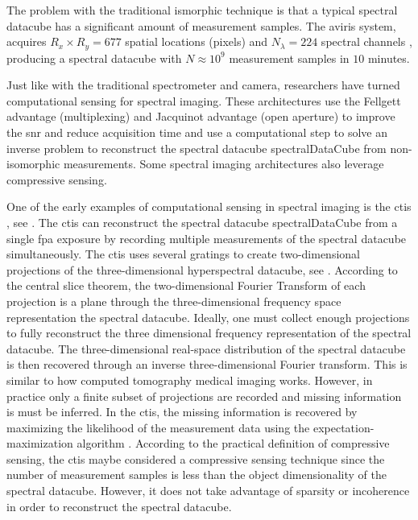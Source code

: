 The problem with the traditional ismorphic technique is that a typical spectral datacube has a significant amount of measurement samples. The \acrfull{aviris} system, acquires $R_x \times R_y = 677$ spatial locations (pixels) and $N_{\lambda} = 224$ spectral channels \cite{green1998imaging}, producing a spectral datacube with $N \approx 10^9$ measurement samples in $10$ minutes. 

Just like with the traditional spectrometer and camera, researchers have turned \gls{computational sensing} for spectral imaging. These architectures use the \gls{Fellgett advantage} (multiplexing) and \gls{Jacquinot advantage} (open aperture) to improve the \acrfull{snr} and reduce acquisition time and use a computational step to solve an inverse problem to reconstruct the spectral datacube \gls{spectralDataCube} from non-isomorphic measurements. Some spectral imaging architectures also leverage \gls{compressive sensing}. 

One of the early examples of computational sensing in spectral imaging is the \gls{ctis} \cite{descour1995computed}, see . The \gls{ctis} can reconstruct the spectral datacube \gls{spectralDataCube} from a single \gls{fpa} exposure by recording multiple measurements of the spectral datacube simultaneously. The \gls{ctis} uses several gratings to create two-dimensional projections of the three-dimensional hyperspectral datacube, see . According to the central slice theorem, the two-dimensional Fourier Transform of each projection is a plane through the three-dimensional frequency space representation the spectral datacube. Ideally, one must collect enough projections to fully reconstruct the three dimensional frequency representation of the spectral datacube. The three-dimensional real-space distribution of the spectral datacube is then recovered through an inverse three-dimensional Fourier transform. This is similar to how computed tomography medical imaging works. However, in practice only a finite subset of projections are recorded and missing information is must be inferred. In the \gls{ctis}, the missing information is recovered by maximizing the likelihood of the measurement data using the expectation-maximization algorithm \cite{steven1993fundamentals, moon1996expectation}. According to the practical definition of compressive sensing, the \gls{ctis} maybe considered a compressive sensing technique since the number of measurement samples is less than the object dimensionality of the spectral datacube. However, it does not take advantage of sparsity or incoherence in order to reconstruct the spectral datacube.

